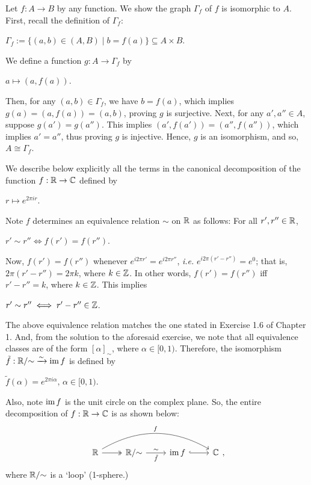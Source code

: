 \begin{xca}
Let $f: A \to B$ by any function. We show the graph $\Gamma_f$ of $f$ is
isomorphic to $A$. First, recall the definition of $\Gamma_f$:
\begin{center}
    $\Gamma_f := \{ (a, b) \in (A, B) \mid b = f(a) \} \subseteq A \times B$.
\end{center}
We define a function $g: A \to \Gamma_f$ by
\begin{center}
    $a \mapsto (a, f(a))$.
\end{center}
Then, for any $(a, b) \in \Gamma_f$, we have $b = f(a)$, which implies $g(a) =
(a, f(a)) = (a, b)$, proving $g$ is surjective. Next, for any $a', a'' \in A$,
suppose $g(a') = g(a'')$. This implies $(a', f(a')) = (a'', f(a''))$, which
implies $a' = a''$, thus proving $g$ is injective. Hence, $g$ is an isomorphism,
and so, $A \cong \Gamma_f$.
\end{xca}

\begin{xca}
We describe below explicitly all the terms in the canonical decomposition of the
function $f: \mathbb{R} \to \mathbb{C}$ defined by
\begin{center}
    $r \mapsto e^{2\pi ir}$.
\end{center}
Note $f$ determines an equivalence relation $\sim$ on $\mathbb{R}$ as follows: For all
$r', r'' \in \mathbb{R}$,
\begin{center}
    $r' \sim r'' \iff f(r') = f(r'')$.
\end{center}
Now, $f(r') = f(r'')$ whenever $e^{i2\pi r'} = e^{i2\pi r''}$, \emph{i.e.}
$e^{i2\pi(r' - r'')} = e^0$; that is, $2\pi(r' - r'') = 2\pi k$, where $k \in
\mathbb{Z}$. In other words, $f(r') = f(r'')$ iff $r' - r'' = k$, where $k \in \mathbb{Z}$.
This implies
\begin{center}
    $r' \sim r'' \iff r' - r'' \in \mathbb{Z}$.
\end{center}
The above equivalence relation matches the one stated in Exercise 1.6 of
Chapter 1. And, from the solution to the aforesaid exercise, we note that all
equivalence classes are of the form $[\alpha]_{\sim}$, where $\alpha \in [0,
1)$. Therefore, the isomorphism $\tilde{f}: \mathbb{R}/{\sim} \xrightarrow{\sim}
\operatorname{im} f$ is defined by
\begin{center}
    $\tilde{f}(\alpha) = e^{2\pi i\alpha}, \, \alpha \in [0, 1)$.
\end{center}
Also, note $\operatorname{im} f$ is the unit circle on the complex plane. So, the entire
decomposition of $f: \mathbb{R} \to \mathbb{C}$ is as shown below:
\[
\begin{tikzcd}
    \R \arrow[r, two heads]
       \arrow[rrr, bend left, "f"]
       & \R/{\sim} \arrow[r, "\sim"]{r}[swap]{\tilde{f}}
                   & \opn{im} f \arrow[r, hook]
                                & \C
\end{tikzcd},
\]
where $\mathbb{R}/{\sim}$ is a `loop' (1-sphere.)
\end{xca}

